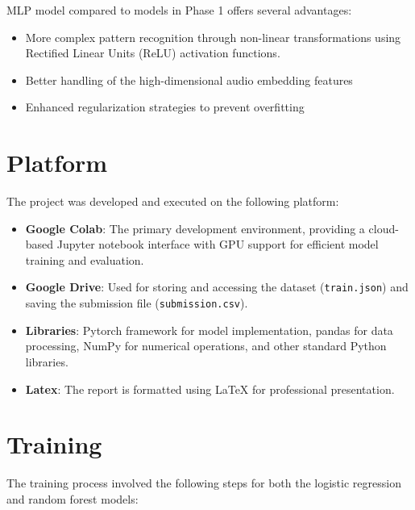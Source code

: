 \documentclass[12pt, a4paper]{article}
\begin{document}
MLP model compared to models in Phase 1 offers several advantages:
\begin{itemize}
    \item More complex pattern recognition through non-linear transformations using Rectified Linear Units (ReLU) activation functions.
    \item Better handling of the high-dimensional audio embedding features
    \item Enhanced regularization strategies to prevent overfitting
\end{itemize}

\section{Platform}
The project was developed and executed on the following platform:

\begin{itemize}
    \item \textbf{Google Colab}: The primary development environment, providing a cloud-based Jupyter notebook interface with GPU support for efficient model training and evaluation.
    \item \textbf{Google Drive}: Used for storing and accessing the dataset (\texttt{train.json}) and saving the submission file (\texttt{submission.csv}).
    \item \textbf{Libraries}: Pytorch framework for model implementation, pandas for data processing, NumPy for numerical operations, and other standard Python libraries.
    \item \textbf{Latex}: The report is formatted using LaTeX for professional presentation.
\end{itemize}

\section{Training}
The training process involved the following steps for both the logistic regression and random forest models:
\end{document}
